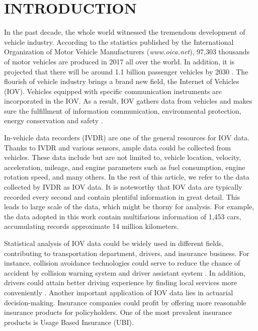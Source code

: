 \documentclass[sii]{ipart}
\theoremstyle{plain}
\begin{document}
\section{INTRODUCTION}

In the past decade, the whole world witnessed the tremendous development of vehicle industry. According to the statistics published by the International Organization of Motor Vehicle Manufacturers ({\it www.oica.net}), 97,303 thousands of motor vehicles are produced in 2017 all over the world. In addition, it is projected that there will be around 1.1 billion passenger vehicles by 2030 \cite{lee2011will}. The flourish of vehicle industry brings a brand new field, the Internet of Vehicles (IOV). Vehicles equipped with specific communication instruments are incorporated in the IOV. As a result, IOV gathers data from vehicles and makes sure the fulfillment of information communication, environmental protection, energy conservation and safety \cite{liu2011internet}.


In-vehicle data recorders (IVDR) are one of the general resources for IOV data. Thanks to IVDR and various sensors, ample data could be collected from vehicles. These data include but are not limited to, vehicle location, velocity, acceleration, mileage, and engine parameters such as fuel consumption, engine rotation speed, and many others. In the rest of this article, we refer to the data collected by IVDR as IOV data. It is noteworthy that IOV data are typically recorded every second and contain plentiful information in great detail. This leads to large scale of the data, which might be thorny for analysis. For example, the data adopted in this work contain multifarious information of 1,453 cars, accumulating records approximate 14 million kilometers.

Statistical analysis of IOV data could be widely used in different fields, contributing to transportation department, drivers, and insurance business. For instance, collision avoidance technologies could serve to reduce the chance of accident by collision warning system and driver assistant system \cite{fangchun2014overview, mclaughlin2008method}. In addition, drivers could attain better driving experience by finding local services more conveniently \cite{fangchun2014overview, karagiannis2011vehicular}. Another important application of IOV data lies in actuarial decision-making. Insurance companies could profit by offering more reasonable insurance products for policyholders. One of the most prevalent insurance products is Usage Based Insurance (UBI).
\end{document}
